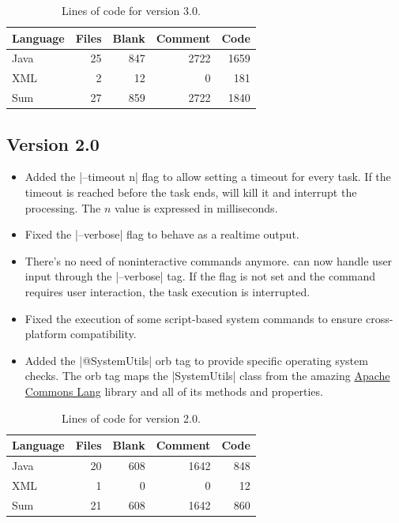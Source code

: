 \documentclass[a4paper,twoside,12pt]{memoir}
\begin{document}
{\renewcommand{\arraystretch}{1.5}
\begin{table}[ht]
\centering
\caption{Lines of code for version 3.0.}
\begin{tabular}{lrrrr}
\hline
\textbf{Language} & \textbf{Files} & \textbf{Blank} & \textbf{Comment} & \textbf{Code}\\
\hline
\hline
Java & 25 & 847 & 2722 & 1659\\
XML & 2 & 12 & 0 & 181\\
\hline
Sum & 27 & 859 & 2722 & 1840\\
\hline
\end{tabular}
\label{tab:locarara30}
\end{table}}

\subsection*{Version 2.0}
\begin{itemize}
\item[\newfeature] 
     Added the |--timeout n| flag to allow setting a timeout for every task. If
     the timeout is reached before the task ends, \arara will kill it and 
     interrupt the processing. The $n$ value is expressed in milliseconds.
\item[\bugfix] 
     Fixed the |--verbose| flag to behave as a realtime output.
\item[\newfeature] 
     There's no need of noninteractive commands anymore. \arara can now handle
     user input through the |--verbose| tag. If the flag is not set and the 
     command requires user interaction, the task execution is interrupted.
\item[\bugfix] 
     Fixed the execution of some script-based system commands to ensure 
     cross-platform compatibility.
\item[\newfeature] 
     Added the |@{SystemUtils}| orb tag to provide specific operating system 
     checks. The orb tag maps the |SystemUtils| class from the amazing 
     \href{http://commons.apache.org/lang/}{Apache Commons Lang} library and 
     all of its methods and properties.
\end{itemize}

{\renewcommand{\arraystretch}{1.5}
\begin{table}[ht]
\centering
\caption{Lines of code for version 2.0.}
\begin{tabular}{lrrrr}
\hline
\textbf{Language} & \textbf{Files} & \textbf{Blank} & \textbf{Comment} & \textbf{Code}\\
\hline
\hline
Java & 20 & 608 & 1642 & 848\\
XML & 1 & 0 & 0 & 12\\
\hline
Sum & 21 & 608 & 1642 & 860\\
\hline
\end{tabular}
\label{tab:locarara20}
\end{table}}
\end{document}
